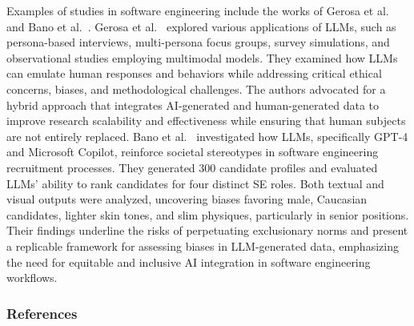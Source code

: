 \documentclass[11pt]{article}
\begin{document}
Examples of studies in software engineering include the works of Gerosa et al.~\cite{DBLP:journals/ase/GerosaTSS24} and Bano et al.~\cite{bano2025doessoftwareengineerlook}. 
Gerosa et al.~\cite{DBLP:journals/ase/GerosaTSS24} explored various applications of LLMs, such as persona-based interviews, multi-persona focus groups, survey simulations, and observational studies employing multimodal models. They examined how LLMs can emulate human responses and behaviors while addressing critical ethical concerns, biases, and methodological challenges. The authors advocated for a hybrid approach that integrates AI-generated and human-generated data to improve research scalability and effectiveness while ensuring that human subjects are not entirely replaced.
Bano et al.~\cite{bano2025doessoftwareengineerlook} investigated how LLMs, specifically GPT-4 and Microsoft Copilot, reinforce societal stereotypes in software engineering recruitment processes. They generated 300 candidate profiles and evaluated LLMs' ability to rank candidates for four distinct SE roles. Both textual and visual outputs were analyzed, uncovering biases favoring male, Caucasian candidates, lighter skin tones, and slim physiques, particularly in senior positions. Their findings underline the risks of perpetuating exclusionary norms and present a replicable framework for assessing biases in LLM-generated data, emphasizing the need for equitable and inclusive AI integration in software engineering workflows.

\subsubsection{References}



\end{document}
